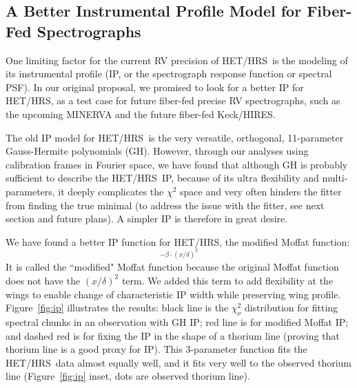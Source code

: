 \documentclass[12pt]{article}
\def\hrs{HET/HRS}
\begin{document}
\vspace{-10pt}
\subsection{A Better Instrumental Profile Model for Fiber-Fed Spectrographs}\label{sec:ip}
\vspace{-5pt}

One limiting factor for the current RV precision of \hrs\ is the
modeling of its instrumental profile (IP, or the spectrograph response
function or spectral PSF). In our original proposal, we promised to
look for a better IP for \hrs, as a test case for future fiber-fed
precise RV spectrographs, such as the upcoming MINERVA and the future
fiber-fed Keck/HIRES.

The old IP model for \hrs\ is the very versatile, orthogonal,
11-parameter Gauss-Hermite polynomials (GH). However, through our
analyses using calibration frames in Fourier space, we have found that
although GH is probably sufficient to describe the \hrs\ IP, because
of its ultra flexibility and multi-parameters, it deeply complicates
the $\chi^2$ space and very often hinders the fitter from finding the
true minimal (to address the issue with the fitter, see next section
and future plans). A simpler IP is therefore in great desire.

We have found a better IP function for \hrs, the modified Moffat function:
\begin{equation}
[1+(x/\theta)^2]^{-\beta\cdot(x/\delta)^2}
\end{equation} 
It is called the ``modified" Moffat function because the original
Moffat function does not have the $(x/\delta)^2$ term. We added this
term to add flexibility at the wings to enable change of characteristic
IP width while preserving wing profile. Figure~\ref{fig:ip}
illustrates the results: black line is the $\chi^2_\nu$ distribution
for fitting spectral chunks in an observation with GH IP; red line is
for modified Moffat IP; and dashed red is for fixing the IP in the
shape of a thorium line (proving that thorium line is a good proxy for
IP). This 3-parameter function fits the \hrs\ data almost equally
well, and it fits very well to the observed thorium line
(Figure~\ref{fig:ip} inset, dots are observed thorium line).
\end{document}
